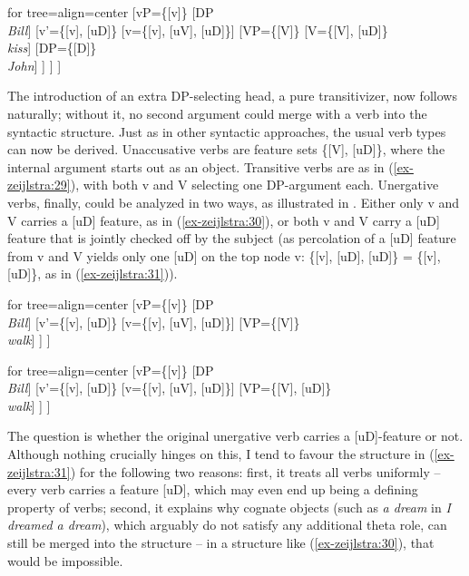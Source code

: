 \documentclass[output=paper
,modfonts
,nonflat]{langsci/langscibook}
\begin{document}
	\begin{exe}
    \ex\label{ex-zeijlstra:29}
			\begin{forest}	for tree={align=center}
				[vP{=}\{{[}v{]}\}
				[DP\\ \textit{Bill}]
				[v'{=}\{{[}v{]}{,} {[}uD{]}\}
				[v{=}\{{[}v{]}{,} {[}uV{]}{,} {[}uD{]}\}]
				[VP{=}\{{[}V{]}\} 
				[V{=}\{{[}V{]}{,} {[}uD{]}\}\\\textit{kiss}]
				[DP{=}\{{[}D{]}\}\\ \textit{John}]
				] ] ] 
		\end{forest}
	\end{exe}
\noindent The introduction of an extra DP-selecting head, a pure transitivizer, now follows naturally; without it, no second argument could merge with a verb into the syntactic structure. Just as in other syntactic approaches, the usual verb types can now be derived. Unaccusative verbs are feature sets \{[V], [uD]\}, where the internal argument starts out as an object. Transitive verbs are as in (\ref{ex-zeijlstra:29}), with both v and V selecting one DP-argument each. Unergative verbs, finally, could be analyzed in two ways, as illustrated in . Either only v and V carries a [uD] feature, as in (\ref{ex-zeijlstra:30}), or both v and V carry a [uD] feature that is jointly checked off by the subject (as percolation of a [uD] feature from v and V yields only one [uD] on the top node v: \{[v], [uD], [uD]\} = \{[v], [uD]\}, as in (\ref{ex-zeijlstra:31})).
\vfill
	\begin{exe}
		\ex\label{ex-zeijlstra:30}
			\begin{forest}	for tree={align=center}
				[vP{=}\{{[}v{]}\}
				[DP\\ \textit{Bill}]
				[v'{=}\{{[}v{]}{,} {[}uD{]}\}
				[v{=}\{{[}v{]}{,} {[}uV{]}{,} {[}uD{]}\}]
				[VP{=}\{{[}V{]}\}\\ \textit{walk}]
				] ]  
		\end{forest}
	\ex \label{ex-zeijlstra:31}
			\begin{forest} for tree={align=center}
				[vP{=}\{{[}v{]}\}
				[DP\\ \textit{Bill}]
				[v'{=}\{{[}v{]}{,} {[}uD{]}\}
				[v{=}\{{[}v{]}{,} {[}uV{]}{,} {[}uD{]}\}]
				[VP{=}\{{[}V{]}{,} {[}uD{]}\}\\ \textit{walk}]
				] ] 
		\end{forest}
	\end{exe}\vfill
\newpage\noindent The question is whether the original unergative verb carries a [uD]-feature or not. Although nothing crucially hinges on this, I tend to favour the structure in (\ref{ex-zeijlstra:31}) for the following two reasons: first, it treats all verbs uniformly – every verb carries a feature [uD], which may even end up being a defining property of verbs; second, it explains why cognate objects (such as \textit{a dream} in \textit{I dreamed a dream}), which arguably do not satisfy any additional theta role, can still be merged into the structure – in a structure like (\ref{ex-zeijlstra:30}), that would be impossible.
\end{document}
